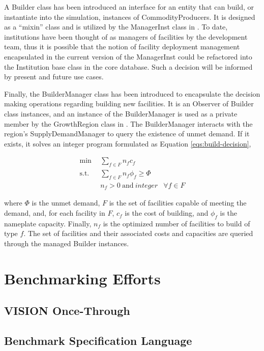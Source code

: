 A Builder class has been introduced an interface for an entity that can build,
or instantiate into the simulation, instances of CommodityProducers. It is
designed as a ``mixin'' class and is utilized by the ManagerInst class in
\Cycamore. To date, institutions have been thought of as managers of facilities
by the \Cyclus development team, thus it is possible that the notion of facility
deployment management encapsulated in the current version of the ManagerInst
could be refactored into the Institution base class in the \Cyclus core
database. Such a decision will be informed by present and future use cases.

Finally, the BuilderManager class has been introduced to encapsulate the
decision making operations regarding building new facilities. It is an Observer
of Builder class instances, and an instance of the BuilderManager is used as a
private member by the GrowthRegion class in \Cycamore. The BuilderManager
interacts with the region's SupplyDemandManager to query the existence of unmet
demand. If it exists, it solves an integer program formulated as Equation
\ref{eqs:build-decision},

\begin{subequations}\label{eqs:build-decision}
  \begin{align}
    \min \:\: & 
    \sum_{f \in F} n_f c_f
    & \\
    \text{s.t.} \:\: &
    \sum_{f \in F} n_f \phi_f \ge \Phi
    & \\
    &
    n_f > 0 \: \text{and} \: integer
    &
    \forall f \in F
  \end{align}
\end{subequations}
  
where $\Phi$ is the unmet demand, $F$ is the set of facilities capable of
meeting the demand, and, for each facility in $F$, $c_f$ is the cost of
building, and $\phi_f$ is the nameplate capacity.  Finally, $n_f$ is the
optimized number of facilities to build of type $f$. The set of facilities and
their associated costs and capacities are queried through the managed Builder
instances.

\subsection{\Cyclopts}

\section{Benchmarking Efforts}\label{sec:prev-benchmark}

\subsection{VISION Once-Through}

\subsection{Benchmark Specification Language}
